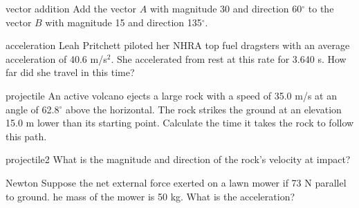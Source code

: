 \documentclass[letterpaper]{article}
\begin{document}
{\begin{question}{vector addition}
Add the vector $A$ with magnitude 30 and direction 60$^\circ$ to the vector $B$ 
with magnitude 15 and direction 135$^\circ$.
\begin{choices}
\end{choices}
\end{question}

\begin{question}{acceleration}
Leah Pritchett piloted her NHRA top fuel dragsters with an average 
acceleration of 40.6 m/s$^2$.  She accelerated from rest at this rate for 
3.640 s. How far did she travel in this time? 
\begin{choices}
\end{choices}
\end{question}

\begin{question}{projectile}
An active volcano ejects a large rock with a speed of 35.0 m/s at an 
angle of 62.8$^\circ$ above the horizontal.  The rock strikes the ground 
at an elevation 15.0 m lower than its starting point. Calculate the time 
it takes the rock to follow this path. 
\begin{choices}
\end{choices}
\end{question}

\begin{question}{projectile2}
What is the magnitude and direction of the rock's velocity at impact?
\begin{choices}
\end{choices}
\end{question}

\begin{question}{Newton}
Suppose the net external force exerted on a lawn mower if 73 N parallel to
ground. he mass of the mower is 50 kg. What is the acceleration?
\begin{choices}
\end{choices}
\end{question}

}
\end{document}
